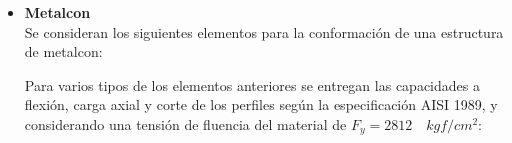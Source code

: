 \begin{itemize}
    \begin{table}[H]
      \centering
      \caption{Resistencias al corte y tracción de elementos de albañilería.}
      \label{albanileria}%
    \end{table}%

    
    \item \textbf{Metalcon}\\
    Se consideran los siguientes elementos para la conformación de una estructura de metalcon:
    
    
    Para varios tipos de los elementos anteriores se entregan las capacidades a flexión, carga axial y corte de los perfiles según la especificación AISI 1989, y considerando una tensión de fluencia del material de $F_{y}=2812 \quad kgf/cm^2$:
    

\end{itemize}
